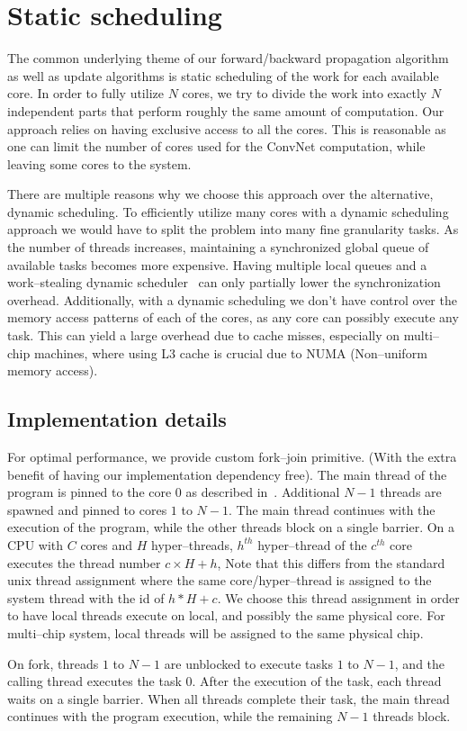 \section{Static scheduling}

  The common underlying theme of our forward/backward propagation
  algorithm as well as update algorithms is static scheduling of the
  work for each available core.  In order to fully utilize $N$ cores,
  we try to divide the work into exactly $N$ independent parts that
  perform roughly the same amount of computation.  Our approach relies
  on having exclusive access to all the cores.  This is reasonable as
  one can limit the number of cores used for the ConvNet computation,
  while leaving some cores to the system.

  There are multiple reasons why we choose this approach over the
  alternative, dynamic scheduling.  To efficiently utilize many cores
  with a dynamic scheduling approach we would have to split the
  problem into many fine granularity tasks.  As the number of threads
  increases, maintaining a synchronized global queue of available
  tasks becomes more expensive.  Having multiple local queues and a
  work--stealing dynamic
  scheduler~\cite{reinders2007intel,willhalm2008putting} can only
  partially lower the synchronization overhead.  Additionally, with a
  dynamic scheduling we don't have control over the memory access
  patterns of each of the cores, as any core can possibly execute any
  task.  This can yield a large overhead due to cache misses,
  especially on multi--chip machines, where using L3 cache is crucial
  due to NUMA (Non--uniform memory access).

  \subsection{Implementation details}

  For optimal performance, we provide custom fork--join primitive.
  (With the extra benefit of having our implementation dependency
  free).  The main thread of the program is pinned to the core $0$ as
  described in~\cite{jeffers2015high}. Additional $N-1$ threads are
  spawned and pinned to cores $1$ to $N-1$.  The main thread continues
  with the execution of the program, while the other threads block on
  a single barrier.  On a CPU with $C$ cores and $H$ hyper--threads,
  $h^{th}$ hyper--thread of the $c^{th}$ core executes the thread
  number $c \times H + h$, Note that this differs from the standard
  unix thread assignment where the same core/hyper--thread is assigned
  to the system thread with the id of $h * H + c$.  We choose this
  thread assignment in order to have local threads execute on local,
  and possibly the same physical core.  For multi--chip system, local
  threads will be assigned to the same physical chip.

  On fork, threads $1$ to $N-1$ are unblocked to execute tasks $1$ to
  $N-1$, and the calling thread executes the task $0$.  After the
  execution of the task, each thread waits on a single barrier.  When
  all threads complete their task, the main thread continues with the
  program execution, while the remaining $N-1$ threads block.
